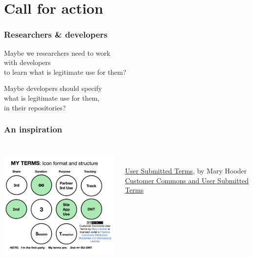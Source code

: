\documentclass[17pt,aspectratio=169,hyperref={pdfusetitle,colorlinks,allcolors=olive}]{beamer}
\begin{document}
\section{Call for action}

\begin{frame}[fragile]
  \frametitle{Researchers \& developers}

  Maybe we researchers need to work \\
  with developers \\
  to learn what is legitimate use for them? \\
  \vspace{.5cm}
  
  Maybe developers should specify \\
  what is legitimate use for them, \\
  in their repositories? \\
  
\end{frame}

\begin{frame}[fragile]
  \frametitle{An inspiration}
  
  \begin{columns}[T]
    \begin{column}{.58\textwidth}
      \includegraphics[height=6cm]{figs/user-terms}
    \end{column}%
    \hfill%
    \begin{column}{.40\textwidth}
      {\footnotesize
        ~
        \vspace{3cm}
        \begin{flushright}
          \href{https://kantarainitiative.org/confluence/display/infosharing/User+Submitted+Terms+--+UX+and+Interface+V.1}{User Submitted Terms}, by Mary Hooder \\
          \href{http://customercommons.org/2014/10/27/customer-commons-and-user-submitted-terms/}{Customer Commons and User Submitted Terms} \\
        \end{flushright}
      }
    \end{column}%
  \end{columns}

\end{frame}
\end{document}
